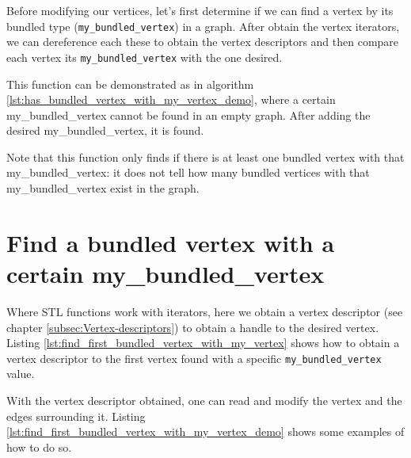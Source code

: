 Before modifying our vertices, let's first determine if we can find a vertex
by its bundled type (\verb;my_bundled_vertex;) in a graph.
After obtain the vertex iterators, we can dereference each these to obtain
the vertex descriptors and then compare each vertex its \verb;my_bundled_vertex;
with the one desired.



This function can be demonstrated as in algorithm 
\ref{lst:has_bundled_vertex_with_my_vertex_demo}, 
where a certain my\_bundled\_vertex cannot be found in an empty graph.
After adding the desired my\_bundled\_vertex, it is found.



Note that this function only finds if there is at least one bundled vertex
with that my\_bundled\_vertex: it does not tell how many bundled vertices
with that my\_bundled\_vertex exist in the graph.

\section{Find a bundled vertex with a certain my\_bundled\_vertex}
\label{subsec:find_bundled_vertex\_with\_my\_vertex}

Where STL functions work with iterators, here we obtain a vertex descriptor
(see chapter \ref{subsec:Vertex-descriptors}) 
to obtain a handle to the desired vertex.
Listing \ref{lst:find_first_bundled_vertex_with_my_vertex}
shows how to obtain a vertex descriptor to the first vertex found with
a specific \verb;my_bundled_vertex; value.



With the vertex descriptor obtained, one can read and modify the vertex
and the edges surrounding it.
Listing 
\ref{lst:find_first_bundled_vertex_with_my_vertex_demo}
shows some examples of how to do so.

